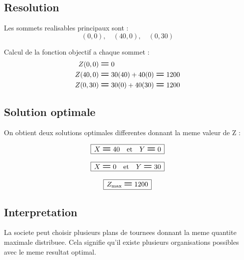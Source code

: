 \documentclass[12pt,a4paper]{article}
\newcommand{\Eq}{\mathrel{\text{\Large\bfseries =}}}
\newcommand{\BoxedEq}[1]{%
  \begin{equation*}
    \boxed{\,\displaystyle #1\,}
  \end{equation*}%
}
\begin{document}
\subsection*{Resolution}
Les sommets realisables principaux sont :
\[
(0,0), \quad (40,0), \quad (0,30)
\]

Calcul de la fonction objectif a chaque sommet :
\[
\begin{aligned}
Z(0,0)    &\Eq 0 \\
Z(40,0)   &\Eq 30(40) + 40(0)  \Eq 1200 \\
Z(0,30)   &\Eq 30(0)  + 40(30) \Eq 1200
\end{aligned}
\]

\subsection*{Solution optimale}
On obtient deux solutions optimales differentes donnant la meme valeur de Z :

\BoxedEq{X \Eq 40 \quad\text{et}\quad Y \Eq 0}

\BoxedEq{X \Eq 0 \quad\text{et}\quad Y \Eq 30}

\BoxedEq{Z_{\mathrm{max}} \Eq 1200}

\subsection*{Interpretation}
La societe peut choisir plusieurs plans de tournees donnant la meme quantite maximale distribuee. Cela signifie qu'il existe plusieurs organisations possibles avec le meme resultat optimal.
\end{document}
